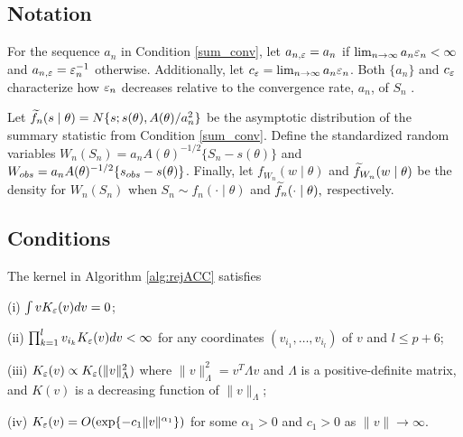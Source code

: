 \subsection{Notation}\label{Appendix_notation}
For the sequence $a_n$ in Condition \ref{sum_conv}, let $a_{n,\veps}=a_{n}$ if $\lim_{n\rightarrow\infty}a_{n}\veps_{n}<\infty$ and $a_{n,\veps}=\veps_{n}^{-1}$ otherwise. Additionally, let  $\ensuremath{c_{\veps}=\lim_{n\rightarrow\infty}a_{n}\veps_{n}}$. Both $\{a_n\}$ and $c_{\veps}$ characterize how $\veps_{n}$ decreases relative to the convergence rate, $a_{n}$, of $S_{n}$ . 

Let $\ftil_{n}(\bs\mid\btheta)=N\{\bs;\bs(\btheta),A(\btheta)/a_{n}^{2}\}$ be the asymptotic distribution of the summary statistic from Condition \ref{sum_conv}. Define the standardized random variables $W_{n}(S_{n})=a_{n}A(\theta)^{-1/2}\{S_{n}-s(\theta)\}$ and $W_{\rm obs}=a_{n}A(\theta)^{-1/2}\{s_{\rm obs}-s(\theta)\}$. Finally, let $f_{W_{n}}(w\mid\theta)$ and $\ftil_{W_{n}}(w\mid\theta)$ be the density for $W_{n}(S_{n})$ when $S_{n}\sim f_{n}(\cdot\mid\theta)$ and $\ftil_n(\cdot\mid\theta),$ respectively. 


\subsection{Conditions}
\begin{condition} \label{kernel_prop}
The kernel in Algorithm \ref{alg:rejACC} satisfies 

\noindent (i) $\int vK_{\veps}(v)dv=0$; 

\noindent (ii) $\prod_{k=1}^{l}v_{i_{k}}K_{\veps}(v)dv<\infty$
		for any coordinates $(v_{i_{1}},\dots,v_{i_{l}})$ of $v$ and $l\leq p+6$;
		
\noindent (iii) $K_{\veps}(v)\propto K_{\veps}(\|v\|_{\Lambda}^{2})$ where $\|v\|_{\Lambda}^{2}=v^{T}\Lambda v$
		and $\Lambda$ is a positive-definite matrix, and $K(v)$ is a decreasing
		function of $\|v\|_{\Lambda}$; 
		
		\noindent (iv) $K_{\veps}(v)=O(\exp\{-c_{1}\|v\|^{\alpha_{1}}\})$
		for some $\alpha_{1}>0$ and $c_{1}>0$ as $\|v\|\rightarrow\infty$. 
\end{condition}

